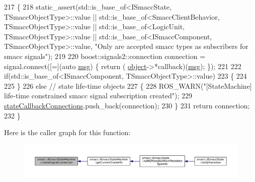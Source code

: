 \begin{DoxyCode}
217 \{
218     static\_assert(std::is\_base\_of<ISmaccState, TSmaccObjectType>::value || 
      std::is\_base\_of<SmaccClientBehavior, TSmaccObjectType>::value || std::is\_base\_of<LogicUnit, TSmaccObjectType>::value || 
      std::is\_base\_of<ISmaccComponent, TSmaccObjectType>::value, \textcolor{stringliteral}{"Only are accepted smacc types as subscribers for smacc signals"});
219 
220     boost::signals2::connection connection = signal.connect([=](\textcolor{keyword}{auto} \hyperlink{namespacekeyboard__node_a768777e12f75b89e4a0a60acf748e9eb}{msg}) \{ \textcolor{keywordflow}{return} (
      \hyperlink{classobject}{object}->*callback)(\hyperlink{namespacekeyboard__node_a768777e12f75b89e4a0a60acf748e9eb}{msg}); \});
221 
222     \textcolor{keywordflow}{if}(std::is\_base\_of<ISmaccComponent, TSmaccObjectType>::value)
223     \{
224 
225     \}
226     \textcolor{keywordflow}{else} \textcolor{comment}{// state life-time objects}
227     \{
228         ROS\_WARN(\textcolor{stringliteral}{"[StateMachine] life-time constrained smacc signal subscription created"});
229         \hyperlink{classsmacc_1_1ISmaccStateMachine_aaf98bb0edaa5d8c84767e4acfad3548d}{stateCallbackConnections}.push\_back(connection);
230     \}
231     \textcolor{keywordflow}{return} connection;
232 \}
\end{DoxyCode}


Here is the caller graph for this function\+:
\nopagebreak
\begin{figure}[H]
\begin{center}
\leavevmode
\includegraphics[width=350pt]{classsmacc_1_1ISmaccStateMachine_adf0f42ade0c65cc471960fe2a7c42da2_icgraph}
\end{center}
\end{figure}


